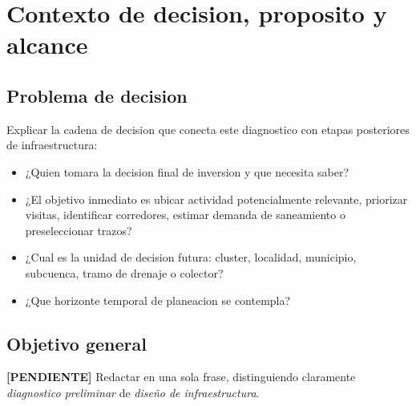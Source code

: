 \documentclass[11pt,letterpaper]{article}
\newcommand{\pendiente}{\textcolor{AtoyacRed}{\textbf{[PENDIENTE]}}}
\begin{document}
\section{Contexto de decision, proposito y alcance}

\subsection{Problema de decision}
Explicar la cadena de decision que conecta este diagnostico con etapas posteriores de infraestructura:

\begin{center}
\end{center}

\begin{preguntas}
\begin{itemize}
    \item ¿Quien tomara la decision final de inversion y que necesita saber?
    \item ¿El objetivo inmediato es ubicar actividad potencialmente relevante, priorizar visitas, identificar corredores, estimar demanda de saneamiento o preseleccionar trazos?
    \item ¿Cual es la unidad de decision futura: cluster, localidad, municipio, subcuenca, tramo de drenaje o colector?
    \item ¿Que horizonte temporal de planeacion se contempla?
\end{itemize}
\end{preguntas}

\subsection{Objetivo general}
\pendiente\; Redactar en una sola frase, distinguiendo claramente \textit{diagnostico preliminar} de \textit{diseño de infraestructura}.
\end{document}
